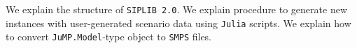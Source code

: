 We explain the structure of \texttt{SIPLIB 2.0}. We explain procedure to generate new instances with user-generated scenario data using \texttt{Julia} scripts. We explain how to convert \texttt{JuMP.Model}-type object to \texttt{SMPS} files.